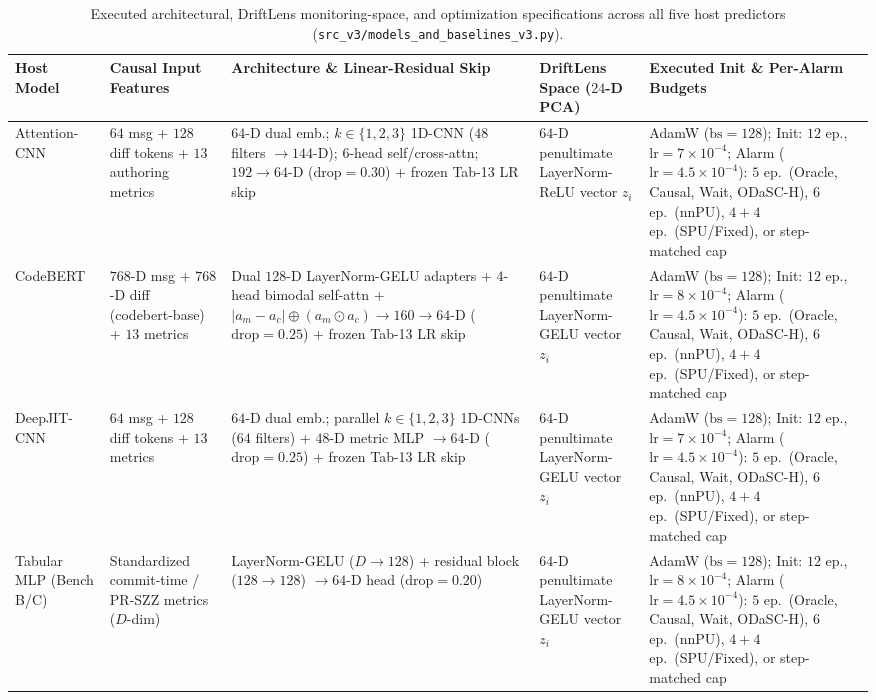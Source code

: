 \documentclass[10pt,a4paper]{article}
\renewcommand{\arraystretch}{1.08}
\begin{document}
\begin{table}[!htbp]
\centering
\caption{Executed architectural, DriftLens monitoring-space, and optimization specifications across all five host predictors (\texttt{src\_v3/models\_and\_baselines\_v3.py}).}
\label{tab:backbone_specs}
\fontsize{7.5}{9.0}\selectfont
\renewcommand{\arraystretch}{1.05}
\setlength{\tabcolsep}{2.2pt}
\begin{tabularx}{\textwidth}{L{2.3cm}L{2.7cm}Y L{2.8cm}L{3.7cm}}
\toprule
\textbf{Host Model} & \textbf{Causal Input Features} & \textbf{Architecture \& Linear-Residual Skip} & \textbf{DriftLens Space ($24$-D PCA)} & \textbf{Executed Init \& Per-Alarm Budgets} \\
\midrule
Attention-CNN \citep{pote2026adaptive} & $64$ msg + $128$ diff tokens + $13$ authoring metrics & $64$-D dual emb.; $k\in\{1,2,3\}$ 1D-CNN ($48$ filters $\to 144$-D); $6$-head self/cross-attn; $192\to 64$-D ($\text{drop}=0.30$) + frozen Tab-13 LR skip & $64$-D penultimate LayerNorm-ReLU vector $z_i$ & AdamW ($\text{bs}=128$); Init: $12$ ep., $\text{lr}=7{\times}10^{-4}$; Alarm ($\text{lr}=4.5{\times}10^{-4}$): $5$ ep.\ (Oracle, Causal, Wait, ODaSC-H), $6$ ep.\ (nnPU), $4{+}4$ ep.\ (SPU/Fixed), or step-matched cap \\
CodeBERT \citep{feng2020codebert} & $768$-D msg + $768$-D diff (codebert-base) + $13$ metrics & Dual $128$-D LayerNorm-GELU adapters + $4$-head bimodal self-attn + $|a_m-a_c| \oplus (a_m\odot a_c) \to 160 \to 64$-D ($\text{drop}=0.25$) + frozen Tab-13 LR skip & $64$-D penultimate LayerNorm-GELU vector $z_i$ & AdamW ($\text{bs}=128$); Init: $12$ ep., $\text{lr}=8{\times}10^{-4}$; Alarm ($\text{lr}=4.5{\times}10^{-4}$): $5$ ep.\ (Oracle, Causal, Wait, ODaSC-H), $6$ ep.\ (nnPU), $4{+}4$ ep.\ (SPU/Fixed), or step-matched cap \\
DeepJIT-CNN \citep{hoang2019deepjit} & $64$ msg + $128$ diff tokens + $13$ metrics & $64$-D dual emb.; parallel $k\in\{1,2,3\}$ 1D-CNNs ($64$ filters) + $48$-D metric MLP $\to 64$-D ($\text{drop}=0.25$) + frozen Tab-13 LR skip & $64$-D penultimate LayerNorm-GELU vector $z_i$ & AdamW ($\text{bs}=128$); Init: $12$ ep., $\text{lr}=7{\times}10^{-4}$; Alarm ($\text{lr}=4.5{\times}10^{-4}$): $5$ ep.\ (Oracle, Causal, Wait, ODaSC-H), $6$ ep.\ (nnPU), $4{+}4$ ep.\ (SPU/Fixed), or step-matched cap \\
Tabular MLP (Bench B/C) & Standardized commit-time / PR-SZZ metrics ($D$-dim) & LayerNorm-GELU ($D\to 128$) + residual block ($128\to 128$) $\to 64$-D head ($\text{drop}=0.20$) & $64$-D penultimate LayerNorm-GELU vector $z_i$ & AdamW ($\text{bs}=128$); Init: $12$ ep., $\text{lr}=8{\times}10^{-4}$; Alarm ($\text{lr}=4.5{\times}10^{-4}$): $5$ ep.\ (Oracle, Causal, Wait, ODaSC-H), $6$ ep.\ (nnPU), $4{+}4$ ep.\ (SPU/Fixed), or step-matched cap \\

\end{tabularx}
\end{table}
\end{document}
